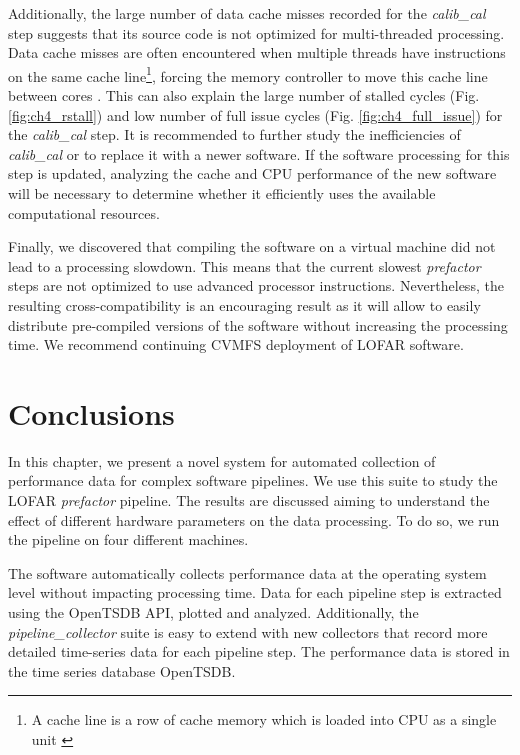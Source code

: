 Additionally, the large number of data cache misses recorded for the \textit{calib\_cal} step suggests that its source code is not optimized for multi-threaded processing. Data cache misses are often encountered when multiple threads have instructions on the same cache line\footnote{A cache line is a row of cache memory which is loaded into CPU as a single unit \citep{cache_architecture} }, forcing the memory controller to move this cache line between cores \citep{cache_misses}. This can also explain the large number of stalled cycles (Fig. \ref{fig:ch4_rstall}) and low number of full issue cycles (Fig. \ref{fig:ch4_full_issue}) for the \textit{calib\_cal} step. It is recommended to further study the inefficiencies of  \textit{calib\_cal} or to replace it with a newer software. If the software processing for this step is updated, analyzing the cache and CPU performance of the new software will be necessary to determine whether it efficiently uses the available computational resources. 


Finally, we discovered that compiling the software on a virtual machine did not lead to a processing slowdown. This means that the current slowest \textit{prefactor} steps are not optimized to use advanced processor instructions. Nevertheless, the resulting cross-compatibility is an encouraging result as it will allow to easily distribute pre-compiled versions of the software without increasing the processing time. We recommend continuing CVMFS deployment of LOFAR software. 


\section{Conclusions}
 
In this chapter, we present a novel system for automated collection of performance data for complex software pipelines. We use this suite to study the LOFAR \textit{prefactor} pipeline. The results are discussed aiming to understand the effect of different hardware parameters on the data processing. To do so, we run the pipeline on four different machines. 

The software automatically collects performance data at the operating system level without impacting processing time. Data for each pipeline step is extracted using the OpenTSDB API, plotted and analyzed. Additionally, the \textit{pipeline\_collector} suite is easy to extend with new collectors that record more detailed time-series data for each pipeline step. The performance data is stored in the time series database OpenTSDB.

